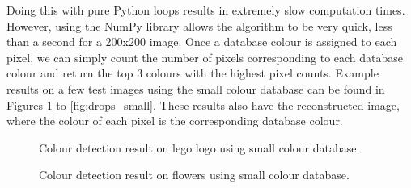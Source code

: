 \documentclass[a4paper,11pt]{article}
\begin{document}
Doing this with pure Python loops results in extremely slow computation times. However, using the NumPy library allows the algorithm to be very quick, less than a second for a 200x200 image. Once a database colour is assigned to each pixel, we can simply count the number of pixels corresponding to each database colour and return the top 3 colours with the highest pixel counts. Example results on a few test images using the small colour database can be found in Figures \ref{fig:lego_small} to \ref{fig:drops_small}. These results also have the reconstructed image, where the colour of each pixel is the corresponding database colour.

\begin{figure}[H]
\centering
{}
\caption{Colour detection result on lego logo using small colour database.}
\label{fig:lego_small}
\end{figure}

\begin{figure}[H]
\centering
{}
\caption{Colour detection result on flowers using small colour database.}
\label{fig:flowers_small}
\end{figure}
\end{document}
